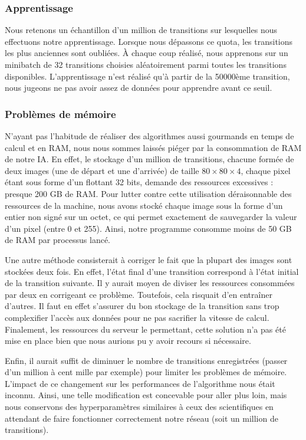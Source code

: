 \subsubsection{Apprentissage}

Nous retenons un échantillon d'un million de transitions sur lesquelles nous effectuons notre apprentissage. Lorsque nous dépassons ce quota, les transitions les 
plus anciennes sont oubliées. À chaque coup réalisé, nous apprenons sur un minibatch de 32 transitions choisies aléatoirement parmi toutes les transitions disponibles.
L'apprentissage n'est réalisé qu'à partir de la 50000ème transition, nous jugeons ne pas avoir assez de données pour apprendre avant ce seuil.


\subsubsection{Problèmes de mémoire}

N'ayant pas l'habitude de réaliser des algorithmes aussi gourmands en temps de calcul et en RAM, nous nous sommes laissés piéger par la consommation de RAM de 
notre IA. En effet, le stockage d'un million de transitions, chacune formée de deux images (une de départ et une d'arrivée) de taille $80\times80\times4$, chaque pixel
étant sous forme d'un flottant 32 bits, demande des ressources excessives : presque 200 GB de RAM. Pour lutter contre cette utilisation déraisonnable des ressources de
la machine, nous avons stocké chaque image sous la forme d'un entier non signé sur un octet, ce qui permet exactement de sauvegarder la valeur d'un pixel (entre 0 et 255).
Ainsi, notre programme consomme moins de 50 GB de RAM par processus lancé. 

Une autre méthode consisterait à corriger le fait que la plupart des images sont stockées deux fois. En effet, l'état final d'une transition correspond à l'état
initial de la transition suivante. Il y aurait moyen de diviser les ressources consommées par deux en corrigeant ce problème. Toutefois, cela risquait d'en entraîner
d'autres. Il faut en effet s'assurer du bon stockage de la transition sans trop complexifier l'accès aux données pour ne pas sacrifier la vitesse de calcul. 
Finalement, les ressources du serveur le permettant, cette solution n'a pas été mise en place bien que nous aurions pu y avoir recours si nécessaire.

Enfin, il aurait suffit de diminuer le nombre de transitions enregistrées (passer d'un million à cent mille par exemple) pour limiter les problèmes de mémoire. L'impact
de ce changement sur les performances de l'algorithme nous était inconnu. Ainsi, une telle modification est concevable pour aller plus loin, mais nous conservons
des hyperparamètres similaires à ceux des scientifiques en attendant de faire fonctionner correctement notre réseau (soit un million de transitions).


